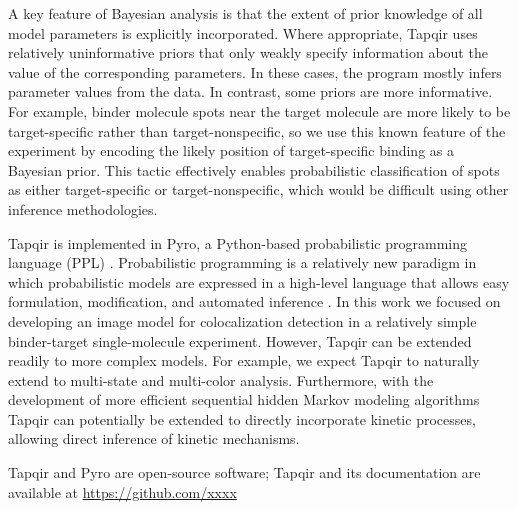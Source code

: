 A key feature of Bayesian analysis is that the extent of prior knowledge of all model parameters is explicitly incorporated. Where appropriate, Tapqir uses relatively uninformative priors that only weakly specify information about the value of the corresponding parameters.  In these cases, the program mostly infers parameter values from the data.  In contrast, some priors are more informative.  For example, binder molecule spots near the target molecule are more likely to be target-specific rather than target-nonspecific, so we use this known feature of the experiment by encoding the likely position of target-specific binding as a Bayesian prior. This tactic effectively enables probabilistic classification of spots as either target-specific or target-nonspecific, which would be difficult using other inference methodologies.

Tapqir is implemented in Pyro, a Python-based probabilistic programming language (PPL) \cite{Bingham2019-qy}. Probabilistic programming is a relatively new paradigm in which probabilistic models are expressed in a high-level language that allows easy formulation, modification, and automated inference \cite{Van_de_Meent2018-mi}. In this work we focused on developing an image model for colocalization detection in a relatively simple binder-target single-molecule experiment. However, Tapqir can be extended readily to more complex models. For example, we expect Tapqir to naturally extend to multi-state and multi-color analysis. Furthermore, with the development of more efficient sequential hidden Markov modeling algorithms \cite{Sarkka2019-jw,Obermeyer2019-pp} Tapqir can potentially be extended to directly incorporate kinetic processes, allowing direct inference of kinetic mechanisms.

Tapqir and Pyro are open-source software; Tapqir and its documentation are available at \url{https://github.com/xxxx}

